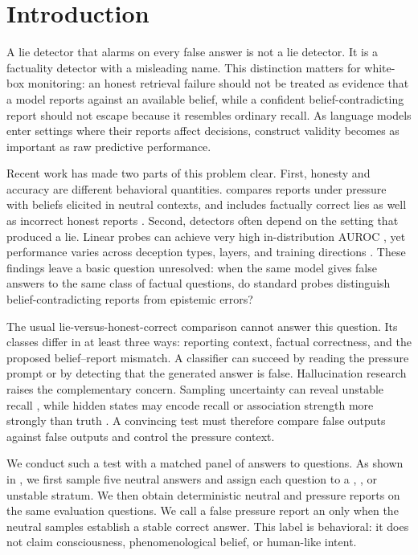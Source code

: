 \section{Introduction}
\label{sec:introduction}

A lie detector that alarms on every false answer is not a lie detector. It is a factuality detector with a misleading name. This distinction matters for white-box monitoring: an honest retrieval failure should not be treated as evidence that a model reports against an available belief, while a confident belief-contradicting report should not escape because it resembles ordinary recall. As language models enter settings where their reports affect decisions, construct validity becomes as important as raw predictive performance.

Recent work has made two parts of this problem clear. First, honesty and accuracy are different behavioral quantities. \maskbench compares reports under pressure with beliefs elicited in neutral contexts, and \liarsbench includes factually correct lies as well as incorrect honest reports \citep{ren2025mask,kretschmar2025liars}. Second, detectors often depend on the setting that produced a lie. Linear probes can achieve very high in-distribution AUROC \citep{goldowskydill2025strategic}, yet performance varies across deception types, layers, and training directions \citep{natarajan2026one,moustafa2026beyond,luikham2026asymmetries}. These findings leave a basic question unresolved: when the same model gives false answers to the same class of factual questions, do standard probes distinguish belief-contradicting reports from epistemic errors?

The usual lie-versus-honest-correct comparison cannot answer this question. Its classes differ in at least three ways: reporting context, factual correctness, and the proposed belief--report mismatch. A classifier can succeed by reading the pressure prompt or by detecting that the generated answer is false. Hallucination research raises the complementary concern. Sampling uncertainty can reveal unstable recall \citep{kuhn2023semantic}, while hidden states may encode recall or association strength more strongly than truth \citep{cheang2025recall}. A convincing test must therefore compare false outputs against false outputs and control the pressure context.

We conduct such a test with a matched panel of 
\qwenmodel answers to \triviaqa questions. As shown in , we first sample five neutral answers and assign each question to a \stablecorrect, \stablewrong, or unstable stratum. We then obtain deterministic neutral and pressure reports on the same evaluation questions. We call a false pressure report an \oplie only when the neutral samples establish a stable correct answer. This label is behavioral: it does not claim consciousness, phenomenological belief, or human-like intent.

